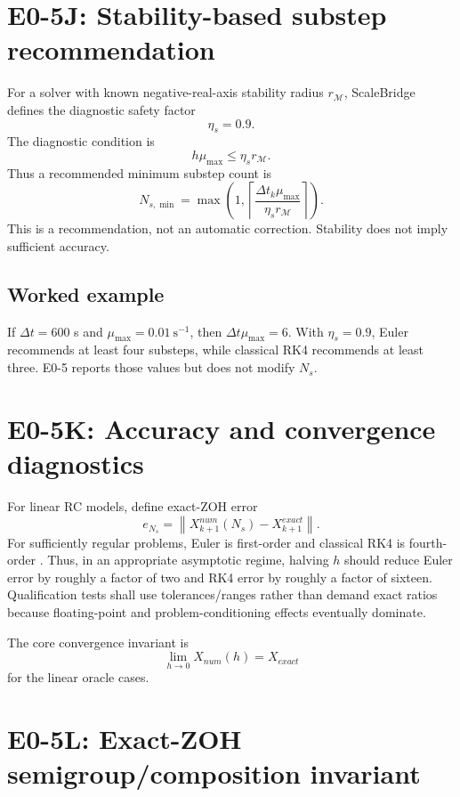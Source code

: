 \documentclass[11pt]{article}
\begin{document}
\section{E0-5J: Stability-based substep recommendation}

For a solver with known negative-real-axis stability radius $r_{\mathcal M}$,
ScaleBridge defines the diagnostic safety factor
\[
\boxed{\eta_s=0.9.}
\]
The diagnostic condition is
\[
\boxed{
h\mu_{\max}\le\eta_s r_{\mathcal M}.
}
\]
Thus a recommended minimum substep count is
\[
\boxed{
N_{s,\min}
=
\max\left(
1,
\left\lceil
\frac{\Delta t_k\mu_{\max}}{\eta_s r_{\mathcal M}}
\right\rceil
\right).
}
\]
This is a recommendation, not an automatic correction. Stability does not imply
sufficient accuracy.

\subsection*{Worked example}
If $\Delta t=600$ s and $\mu_{\max}=0.01\ \mathrm{s}^{-1}$, then
$\Delta t\mu_{\max}=6$. With $\eta_s=0.9$, Euler recommends at least four
substeps, while classical RK4 recommends at least three. E0-5 reports those
values but does not modify $N_s$.

\section{E0-5K: Accuracy and convergence diagnostics}

For linear RC models, define exact-ZOH error
\[
\boxed{
e_{N_s}
=
\left\|
X_{k+1}^{num}(N_s)-X_{k+1}^{exact}
\right\|.
}
\]
For sufficiently regular problems, Euler is first-order and classical RK4 is
fourth-order \cite{Butcher2016ODE,HairerNorsettWanner1993ODEI}. Thus, in an
appropriate asymptotic regime, halving $h$ should reduce Euler error by roughly a
factor of two and RK4 error by roughly a factor of sixteen. Qualification tests
shall use tolerances/ranges rather than demand exact ratios because floating-point
and problem-conditioning effects eventually dominate.

The core convergence invariant is
\[
\boxed{
\lim_{h\to0}X_{num}(h)=X_{exact}
}
\]
for the linear oracle cases.

\section{E0-5L: Exact-ZOH semigroup/composition invariant}
\end{document}
